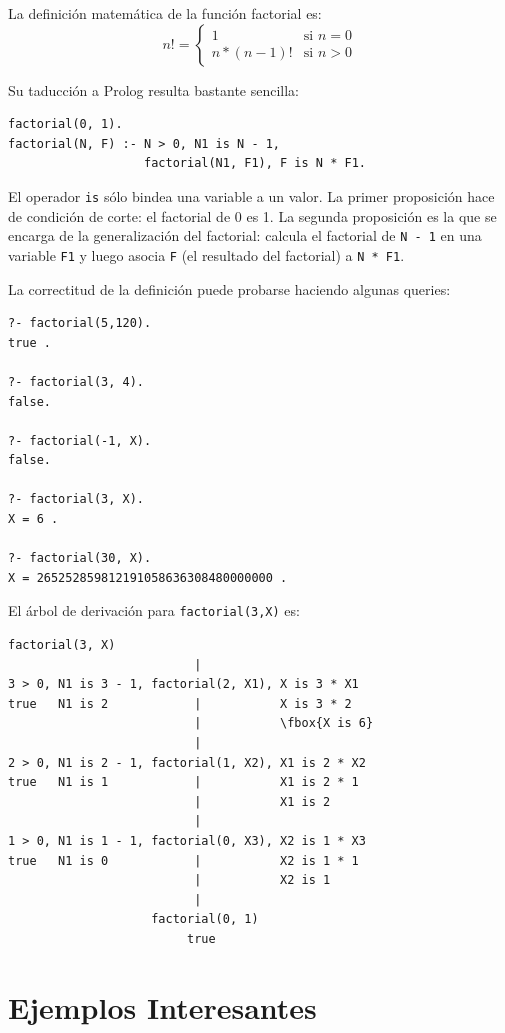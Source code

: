 \documentclass[12pt,titlepage]{article}
\begin{document}
La definición matemática de la función factorial es:
\[
n!=\left\{
  \begin{array}{ll}
    1 & \text{si } n=0 \\
    n*(n-1)! & \text{si } n>0
  \end{array}
\right.
\]

Su taducción a Prolog resulta bastante sencilla:
\begin{lstlisting}
factorial(0, 1).
factorial(N, F) :- N > 0, N1 is N - 1, 
                   factorial(N1, F1), F is N * F1.
\end{lstlisting}

El operador \lstinline|is| sólo bindea una variable a un valor. La primer proposición hace de condición de corte: el factorial de 0 es 1. La segunda proposición es la que se encarga de la generalización del factorial: calcula el factorial de \lstinline|N - 1| en una variable \lstinline|F1| y luego asocia \lstinline|F| (el resultado del factorial) a \lstinline|N * F1|.

La correctitud de la definición puede probarse haciendo algunas queries:
\begin{lstlisting}
?- factorial(5,120).
true .

?- factorial(3, 4).
false.

?- factorial(-1, X).
false.

?- factorial(3, X).
X = 6 .

?- factorial(30, X).
X = 265252859812191058636308480000000 .
\end{lstlisting}

El árbol de derivación para \lstinline|factorial(3,X)| es:
\begin{Verbatim}[samepage=true,fontsize=\small,commandchars=\\\{\}]
                    factorial(3, X)
                          |
3 > 0, N1 is 3 - 1, factorial(2, X1), X is 3 * X1
true   N1 is 2            |           X is 3 * 2
                          |           \fbox{X is 6}
                          |
2 > 0, N1 is 2 - 1, factorial(1, X2), X1 is 2 * X2
true   N1 is 1            |           X1 is 2 * 1
                          |           X1 is 2
                          |
1 > 0, N1 is 1 - 1, factorial(0, X3), X2 is 1 * X3
true   N1 is 0            |           X2 is 1 * 1
                          |           X2 is 1
                          |
                    factorial(0, 1)
                         true
\end{Verbatim}

\newpage
\section{Ejemplos Interesantes}
\end{document}
